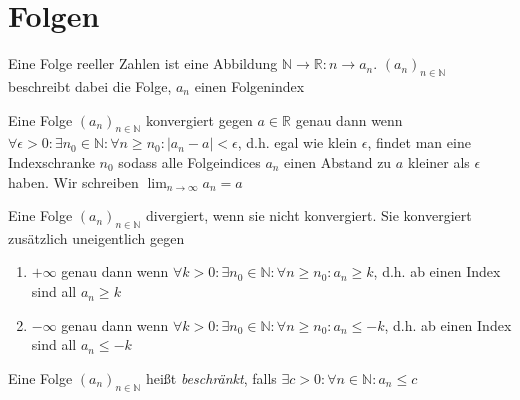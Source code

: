\documentclass[]{article}
\begin{document}
\section{Folgen}

\begin{definition}
	Eine Folge reeller Zahlen ist eine Abbildung $\mathbb{N} \rightarrow \mathbb{R} : n \rightarrow a_n$. $(a_n)_{n \in \mathbb{N}}$ beschreibt dabei die Folge, $a_n$ einen Folgenindex
\end{definition}


\begin{definition}
	Eine Folge $(a_n)_{n \in \mathbb{N}}$ konvergiert gegen $a \in \mathbb{R}$ genau dann wenn \\ $\forall \epsilon > 0 : \exists n_0 \in \mathbb{N} : \forall n \geq n_0 : | a_n - a | < \epsilon$, d.h. egal wie klein $\epsilon$, findet man eine Indexschranke $n_0$ sodass alle Folgeindices $a_n$ einen Abstand zu $a$ kleiner als $\epsilon$ haben. Wir schreiben $\lim_{n \rightarrow \infty} a_n = a$
\end{definition}

\begin{definition}
	Eine Folge $(a_n)_{n \in \mathbb{N}}$ divergiert, wenn sie nicht konvergiert. Sie konvergiert zusätzlich uneigentlich gegen
	\begin{enumerate}[noitemsep]
		\item $+ \infty$ genau dann wenn $\forall k > 0 : \exists n_0 \in \mathbb{N} : \forall n \geq n_0 : a_n \geq k$, d.h. ab einen Index sind all $a_n \geq k$
		\item $- \infty$ genau dann wenn $\forall k > 0 : \exists n_0 \in \mathbb{N} : \forall n \geq n_0 : a_n \leq -k$, d.h. ab einen Index sind all $a_n \leq -k$		
	\end{enumerate}
\end{definition}

\begin{definition}
	Eine Folge $(a_n)_{n \in \mathbb{N}}$ heißt \emph{beschränkt}, falls $\exists c > 0 : \forall n \in \mathbb{N} : a_n \leq c$
\end{definition}
\end{document}
